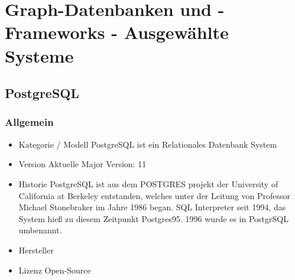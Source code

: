 \chapter{Graph-Datenbanken und -Frameworks - Ausgewählte Systeme }
\section{PostgreSQL}
\subsection{Allgemein}
    \begin{itemize}
        \item Kategorie / Modell
            \subitem PostgreSQL ist ein Relationales Datenbank System \cite{postgresqldoc}
        \item Version
            \subitem Aktuelle Major Version: 11
        \item Historie
            \subitem PostgreSQL ist aus dem POSTGRES projekt der University of California at Berkeley entstanden, welches unter der Leitung von  Professor Michael Stonebraker im Jahre 1986 began.
            SQL Interpreter seit 1994, das System hieß zu diesem Zeitpunkt Postgres95. 1996 wurde es in PostgrSQL umbenannt.\cite{postgresqldoc}
        \item Hersteller
        \item Lizenz
            \subitem Open-Source
    \end{itemize}
